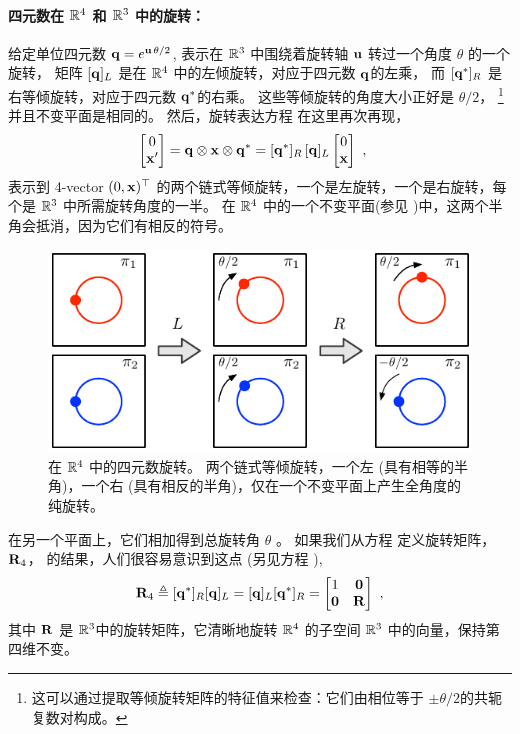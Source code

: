 \paragraph{四元数在 ${\mathbb R}^4$ 和 ${\mathbb R}^3$ 中的旋转：}
% 
给定单位四元数 ${\bf q}=e^{{\bf u}\,\theta/2}$, 表示在 ${\mathbb R}^3$ 中围绕着旋转轴 ${\bf u}$ 转过一个角度 $\theta$ 的一个旋转，
矩阵 $[{\bf q}]_L$ 是在 ${\mathbb R}^4$ 中的左倾旋转，对应于四元数 ${\bf q}$的左乘，
而  $[{\bf q}^*]_R$ 是右等倾旋转，对应于四元数 ${\bf q}^*$的右乘。 
这些等倾旋转的角度大小正好是 $\theta/2$，%
\footnote{这可以通过提取等倾旋转矩阵的特征值来检查：它们由相位等于 $\pm\theta/2$的共轭复数对构成。}
并且不变平面是相同的。
然后，旋转表达方程  在这里再次再现，
%
\begin{align*}
\begin{bmatrix}
0 \\ {\bf x}'
\end{bmatrix}={\bf q}\otimes{\bf x}\otimes{\bf q}^*
&= [{\bf q}^*]_R\,[{\bf q}]_L\begin{bmatrix}
0 \\ {\bf x}
\end{bmatrix} 
~,
\end{align*}
%
表示到 4-vector $(0,{\bf x})^{\top}$ 的两个链式等倾旋转，一个是左旋转，一个是右旋转，每个是 ${\mathbb R}^3$ 中所需旋转角度的一半。 
在 ${\mathbb R}^4$ 中的一个不变平面(参见 )中，这两个半角会抵消，因为它们有相反的符号。 
%
\begin{figure}[tb]
\begin{center}
\includegraphics{figures/isoclinicQ}
\caption{%
在 ${\mathbb R}^4$ 中的四元数旋转。
两个链式等倾旋转，一个左 (具有相等的半角)，一个右 (具有相反的半角)，仅在一个不变平面上产生全角度的纯旋转。
}
\label{fig:isoclinicQ}
\end{center}
\end{figure}
%
在另一个平面上，它们相加得到总旋转角 $\theta$ 。 
如果我们从方程  定义旋转矩阵， ${\bf R}_4$， 的结果，人们很容易意识到这点 (另见方程  ),
%
\begin{align}\label{equ:R4}
{\bf R}_4 \triangleq [{\bf q}^*]_R[{\bf q}]_L=[{\bf q}]_L[{\bf q}^*]_R= \begin{bmatrix}
1 & \bf0 \\
\bf0 & {\bf R}
\end{bmatrix}
~,
\end{align}
%
其中 ${\bf R}$ 是 ${\mathbb R}^3$中的旋转矩阵，它清晰地旋转 ${\mathbb R}^4$ 的子空间 ${\mathbb R}^3$ 中的向量，保持第四维不变。



